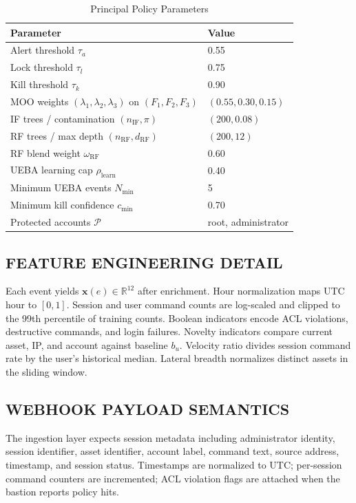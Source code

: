 \documentclass{ieeeaccess}
\begin{document}
\begin{table}[!t]
\caption{Principal Policy Parameters}
\label{tab:policy-params}
\centering
\footnotesize
\begin{tabular}{ll}
\toprule
\textbf{Parameter} & \textbf{Value} \\
\midrule
Alert threshold $\tau_a$ & 0.55 \\
Lock threshold $\tau_l$ & 0.75 \\
Kill threshold $\tau_k$ & 0.90 \\
MOO weights $(\lambda_1,\lambda_2,\lambda_3)$ on $(F_1,F_2,F_3)$ & $(0.55, 0.30, 0.15)$ \\
IF trees / contamination $(n_{\mathrm{IF}},\pi)$ & $(200, 0.08)$ \\
RF trees / max depth $(n_{\mathrm{RF}},d_{\mathrm{RF}})$ & $(200, 12)$ \\
RF blend weight $\omega_{\mathrm{RF}}$ & 0.60 \\
UEBA learning cap $\rho_{\mathrm{learn}}$ & 0.40 \\
Minimum UEBA events $N_{\min}$ & 5 \\
Minimum kill confidence $c_{\min}$ & 0.70 \\
Protected accounts $\mathcal{P}$ & root, administrator \\
\bottomrule
\end{tabular}
\end{table}

\subsection{FEATURE ENGINEERING DETAIL}
Each event yields $\mathbf{x}(e)\in\mathbb{R}^{12}$ after enrichment. Hour normalization maps UTC hour to $[0,1]$. Session and user command counts are log-scaled and clipped to the 99th percentile of training counts. Boolean indicators encode ACL violations, destructive commands, and login failures. Novelty indicators compare current asset, IP, and account against baseline $b_u$. Velocity ratio divides session command rate by the user's historical median. Lateral breadth normalizes distinct assets in the sliding window.

\subsection{WEBHOOK PAYLOAD SEMANTICS}
The ingestion layer expects session metadata including administrator identity, session identifier, asset identifier, account label, command text, source address, timestamp, and session status. Timestamps are normalized to UTC; per-session command counters are incremented; ACL violation flags are attached when the bastion reports policy hits.
\end{document}
